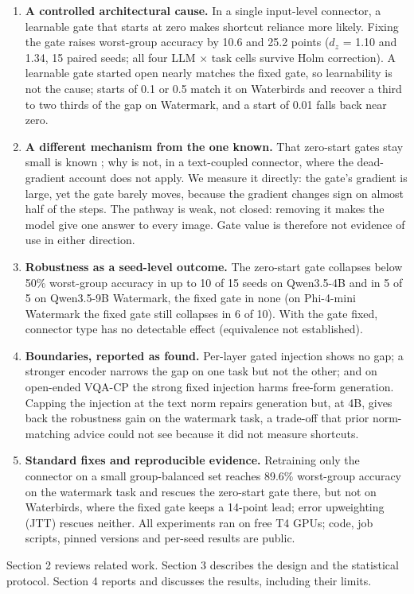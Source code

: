 \begin{enumerate}
\def\labelenumi{\arabic{enumi}.}
\item
  \textbf{A controlled architectural cause.} In a single input-level connector, a learnable gate that starts at zero
  makes shortcut reliance more likely. Fixing the gate raises worst-group accuracy by 10.6 and 25.2 points
  (\(d_z\) = 1.10 and 1.34, 15 paired seeds; all four LLM × task cells survive Holm correction). A learnable gate
  started open nearly matches the fixed gate, so learnability is not the cause; starts of 0.1 or 0.5 match it on
  Waterbirds and recover a third to two thirds of the gap on Watermark, and a start of 0.01 falls back near zero.
\item
  \textbf{A different mechanism from the one known.} That zero-start gates stay small is known
  \citep{lialin2023scalable,farazi2026gate}; why is not, in a text-coupled connector, where the dead-gradient account does
  not apply. We measure it directly: the gate's gradient is large, yet the gate barely moves, because the gradient
  changes sign on almost half of the steps. The
  pathway is weak, not closed: removing it makes the model give one answer to every image. Gate value is therefore not
  evidence of use in either direction.
\item
  \textbf{Robustness as a seed-level outcome.} The zero-start gate collapses below 50\% worst-group accuracy in up to 10 of
  15 seeds on Qwen3.5-4B and in 5 of 5 on Qwen3.5-9B Watermark, the fixed gate in none (on Phi-4-mini Watermark the fixed
  gate still collapses in 6 of 10). With the gate fixed, connector type has no detectable effect (equivalence not
  established).
\item
  \textbf{Boundaries, reported as found.} Per-layer gated injection shows no gap; a stronger encoder narrows the gap on
  one task but not the other; and on open-ended VQA-CP the strong fixed injection harms free-form generation. Capping
  the injection at the text norm repairs generation but, at 4B, gives back the robustness gain on the watermark task, a trade-off that
  prior norm-matching advice could not see because it did not measure shortcuts.
\item
  \textbf{Standard fixes and reproducible evidence.} Retraining only the connector on a small group-balanced set reaches
  89.6\% worst-group accuracy on the watermark task and rescues the zero-start gate there, but not on Waterbirds,
  where the fixed gate keeps a 14-point lead; error upweighting (JTT) rescues neither. All experiments ran on free
  T4 GPUs; code, job scripts, pinned versions and per-seed results are public.
\end{enumerate}

Section 2 reviews related work. Section 3 describes the design and the statistical protocol. Section 4 reports and
discusses the results, including their limits.
